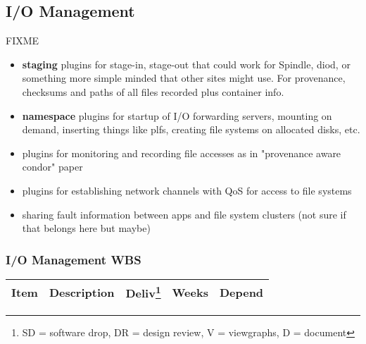 \subsection{I/O Management}

FIXME

\begin{itemize}
\item{\textbf{staging} plugins for stage-in, stage-out that could work
for Spindle, diod, or something more simple minded that other sites might use.
For provenance, checksums and paths of all files recorded plus container info.}
\item{\textbf{namespace} plugins for startup of I/O forwarding servers,
mounting on demand, inserting things like plfs, creating file systems on
allocated disks, etc.}
\item{plugins for monitoring and recording file accesses as in "provenance
  aware condor" paper}
\item{plugins for establishing network channels with QoS for access to file
systems}
\item{sharing fault information between apps and file system clusters
  (not sure if that belongs here but maybe)}
\end{itemize}

\subsubsection{I/O Management WBS}

\begin{longtable}{|p{1cm}|p{10.2cm}|p{1cm}|p{1cm}|p{1.8cm}|}\hline
  \textbf{Item} & \textbf{Description}
                & \textbf{Deliv}\footnote{SD = software drop,
                        DR = design review, V = viewgraphs, D = document}
                & \textbf{Weeks} & \textbf{Depend} \\
  \hline
\end{longtable}

